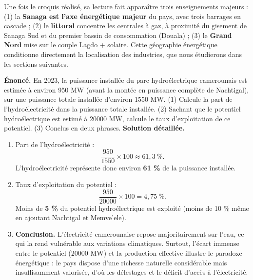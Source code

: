 \documentclass[11pt]{article}
\begin{document}
Une fois le croquis réalisé, sa lecture fait apparaître trois enseignements majeurs : (1) la \textbf{Sanaga est l'axe énergétique majeur} du pays, avec trois barrages en cascade ; (2) le \textbf{littoral} concentre les centrales à gaz, à proximité du gisement de Sanaga Sud et du premier bassin de consommation (Douala) ; (3) le \textbf{Grand Nord} mise sur le couple Lagdo + solaire. Cette géographie énergétique conditionne directement la localisation des industries, que nous étudierons dans les sections suivantes.

\begin{exoresolu}
\textbf{Énoncé.} En 2023, la puissance installée du parc hydroélectrique camerounais est estimée à environ \num{950} MW (avant la montée en puissance complète de Nachtigal), sur une puissance totale installée d'environ \num{1550} MW. (1) Calcule la part de l'hydroélectricité dans la puissance totale installée. (2) Sachant que le potentiel hydroélectrique est estimé à \num{20000} MW, calcule le taux d'exploitation de ce potentiel. (3) Conclus en deux phrases.
\tcblower
\textbf{Solution détaillée.}
\begin{enumerate}
\item Part de l'hydroélectricité :
\[ \frac{950}{1550} \times 100 \approx 61{,}3\ \%. \]
L'hydroélectricité représente donc environ \textbf{61 \%} de la puissance installée.
\item Taux d'exploitation du potentiel :
\[ \frac{950}{20000} \times 100 = 4{,}75\ \%. \]
Moins de \textbf{5 \%} du potentiel hydroélectrique est exploité (moins de 10 \% même en ajoutant Nachtigal et Memve'ele).
\item \textbf{Conclusion.} L'électricité camerounaise repose majoritairement sur l'eau, ce qui la rend vulnérable aux variations climatiques. Surtout, l'écart immense entre le potentiel (\num{20000} MW) et la production effective illustre le paradoxe énergétique : le pays dispose d'une richesse naturelle considérable mais insuffisamment valorisée, d'où les délestages et le déficit d'accès à l'électricité.
\end{enumerate}
\end{exoresolu}
\end{document}
